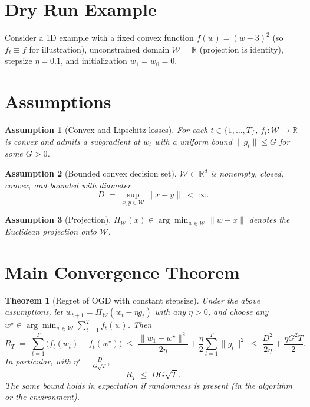 \documentclass[12pt]{article}
\newtheorem{theorem}{Theorem}
\newtheorem{assumption}{Assumption}
\newcommand{\R}{\mathbb{R}}
\begin{document}
\section*{Dry Run Example}
Consider a 1D example with a fixed convex function $f(w)=(w-3)^2$ (so $f_t\equiv f$ for illustration), unconstrained domain $\mathcal{W}=\R$ (projection is identity), stepsize $\eta=0.1$, and initialization $w_1=w_0=0$.

\section*{Assumptions}
\begin{assumption}[Convex and Lipschitz losses]
For each $t\in\{1,\dots,T\}$, $f_t:\to \R$ is convex and admits a subgradient at $w_t$ with a uniform bound $\|g_t\| \le G$ for some $G>0$.
\end{assumption}
\begin{assumption}[Bounded convex decision set]
$\subset \R^d$ is nonempty, closed, convex, and bounded with diameter
\[
D \;=\; \sup_{x,y\in \mathcal{W}} \|x-y\| \;<\; \infty.
\]
\end{assumption}
\begin{assumption}[Projection]
$\Pi_{}(x) \in \arg\min_{w\in {}} \|w-x\|$ denotes the Euclidean projection onto $$.
\end{assumption}

\section*{Main Convergence Theorem}
\begin{theorem}[Regret of OGD with constant stepsize]
\label{thm:ogd}
Under the above assumptions, let $w_{t+1}=\Pi_{}(w_t-\eta g_t)$ with any $\eta>0$, and choose any $w^\star \in \arg\min_{w\in {}} \sum_{t=1}^T f_t(w)$. Then
\[
R_T \;=\; \sum_{t=1}^T \bigl(f_t(w_t)-f_t(w^\star)\bigr)
\;\le\; \frac{\|w_1-w^\star\|^2}{2\eta} + \frac{\eta}{2}\sum_{t=1}^T \|g_t\|^2
\;\le\; \frac{D^2}{2\eta} + \frac{\eta G^2 T}{2}.
\]
In particular, with $\eta^\star = $,
\[
R_T \;\le\; D G \sqrt{T}.
\]
The same bound holds in expectation if randomness is present (in the algorithm or the environment).
\end{theorem}
\end{document}
